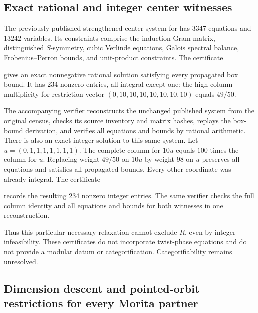 \subsection{Exact rational and integer center witnesses}
\label{subsec:r3472-focus-rational-center}

The previously published strengthened center system for
 has $3347$ equations and $13242$ variables. Its
constraints comprise the induction Gram matrix, distinguished
$S$-symmetry, cubic Verlinde equations, Galois spectral balance,
Frobenius--Perron bounds, and unit-product constraints. The certificate
\begin{quote}\small
{}
\end{quote}
gives an exact nonnegative rational solution satisfying every propagated
box bound. It has $234$ nonzero entries, all integral except one:
the high-column multiplicity for restriction vector
$(0,10,10,10,10,10,10,10)$ equals $49/50$.

The accompanying verifier reconstructs the unchanged published system
from the original census, checks its source inventory and matrix hashes,
replays the box-bound derivation, and verifies all equations and bounds
by rational arithmetic. There is also an exact integer solution to this same system. Let
$u=(0,1,1,1,1,1,1,1)$. The complete column for $10u$ equals $100$ times
the column for $u$. Replacing weight $49/50$ on $10u$ by weight $98$
on $u$ preserves all equations and satisfies all propagated bounds.
Every other coordinate was already integral. The certificate
\begin{quote}\small
{}
\end{quote}
records the resulting $234$ nonzero integer entries. The same verifier
checks the full column identity and all equations and bounds for both
witnesses in one reconstruction.

Thus this particular necessary relaxation cannot exclude $R$, even by
integer infeasibility. These certificates do not incorporate twist-phase
equations and do not provide a modular datum or categorification.
Categorifiability remains unresolved.


\subsection{Dimension descent and pointed-orbit restrictions for every Morita partner}
\label{subsec:focus3472-morita}

